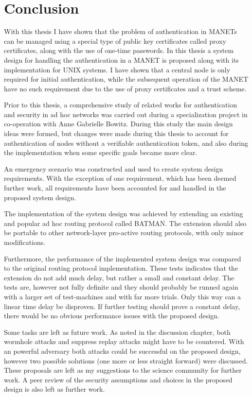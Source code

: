 \chapter{Conclusion}
\label{ch:conclusion}
\acresetall

With this thesis I have shown that the problem of authentication in \aclp{MANET}
can be managed using a special type of public key certificates called proxy
certificates, along with the use of one-time passwords. In this thesis a system
design for handling the authentication in a MANET is proposed along with its
implementation for UNIX systems. I have shown that a central node is only
required for initial authentication, while the subsequent operation of the MANET
have no such requirement due to the use of proxy certificates and a trust
scheme.

Prior to this thesis, a comprehensive study of related works for authentication
and security in ad hoc networks was carried out during a specialization project
in co-operation with Anne Gabrielle Bowitz. During this study the main design
ideas were formed, but changes were made during this thesis to account for
authentication of nodes without a verifiable authentication token, and also
during the implementation when some specific goals became more clear.

An emergency scenario was constructed and used to create system design
requirements. With the exception of one requirement, which has been deemed
further work, all requirements have been accounted for and handled in the
proposed system design.

The implementation of the system design was achieved by extending an existing
and popular ad hoc routing protocol called BATMAN. The extension should also be
portable to other network-layer pro-active routing protocols, with only minor
modifications.

Furthermore, the performance of the implemented system design was compared
to the original routing protocol implementation. These tests indicates that the
extension do not add much delay, but rather a small and constant delay. The
tests are, however not fully definite and they should probably be runned again
with a larger set of test-machines and with far more trials. Only this way can a
linear time delay be disproven. If further testing should prove a constant
delay, there would be no obvious performance issues with the proposed design.

Some tasks are left as future work. As noted in the discussion chapter, both
wormhole attacks and suppress replay attacks might have to be countered. With an
powerful adversary both attacks could be successful on the proposed design,
however two possible solutions (one more or less straight forward) were
discussed. These proposals are left as my suggestions to the science community
for further work. A peer review of the security assumptions and choices in the
proposed design is also left as further work.
